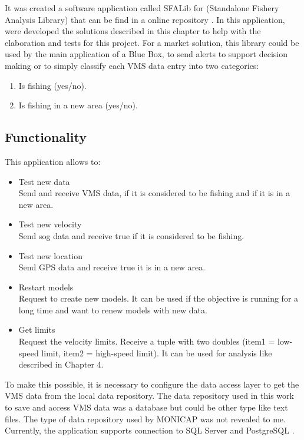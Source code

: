 It was created a software application called SFALib for (Standalone Fishery Analysis Library) that can be find in a online repository \cite{sfagithub}. In this application, were developed the solutions described in this chapter to help with the elaboration and tests for this project. For a market solution, this library could be used by the main application of a Blue Box, to send alerts to support decision making or to simply classify each VMS data entry into two categories:
\begin{enumerate}
\item Is fishing (yes/no).
\item Is fishing in a new area (yes/no).
\end{enumerate}



\subsection{Functionality} %
\label{sub:functionality}

This application allows to:
\begin{itemize}
\item Test new data \\ Send and receive VMS data, if it is considered to be fishing and if it is in a new area.
\item Test new velocity \\ Send sog data and receive true if it is considered to be fishing.
\item Test new location \\ Send GPS data and receive true it is in a new area.
\item Restart models \\ Request to create new models. It can be used if the objective is running for a long time and want to renew models with new data. 
\item Get limits \\ Request the velocity limits. Receive a tuple with two doubles (item1 = low-speed limit, item2 = high-speed limit). It can be used for analysis like described in Chapter 4.
\end{itemize}

To make this possible, it is necessary to configure the data access layer to get the VMS data from the local data repository. The data repository used in this work to save and access VMS data was a database but could be other type like text files. The type of data repository used by MONICAP was not revealed to me.
Currently, the application supports connection to SQL Server \cite{WEBSITE:SqlServer} and PostgreSQL \cite{WEBSITE:Postgresql}.


